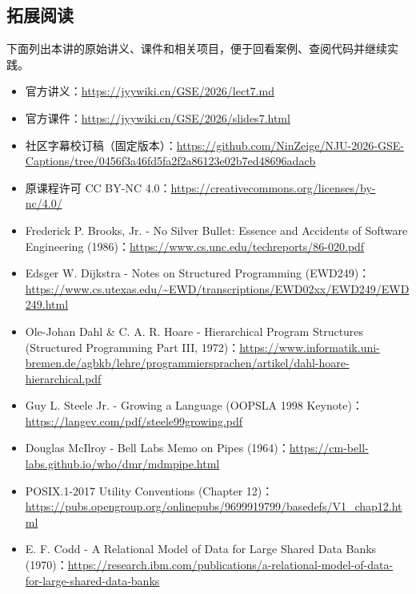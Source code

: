 \documentclass[UTF8,a4paper,11pt,fontset=fandol]{ctexart}
\begin{document}
\subsection{拓展阅读}

下面列出本讲的原始讲义、课件和相关项目，便于回看案例、查阅代码并继续实践。

\begin{itemize}

\item 官方讲义：\url{https://jyywiki.cn/GSE/2026/lect7.md}

\item 官方课件：\url{https://jyywiki.cn/GSE/2026/slides7.html}

\item 社区字幕校订稿（固定版本）：\url{https://github.com/NinZeige/NJU-2026-GSE-Captions/tree/0456f3a46fd5fa2f2a86123e02b7ed48696adacb}

\item 原课程许可 CC BY-NC 4.0：\url{https://creativecommons.org/licenses/by-nc/4.0/}

\item Frederick P. Brooks, Jr. - No Silver Bullet: Essence and Accidents of Software Engineering (1986)：\url{https://www.cs.unc.edu/techreports/86-020.pdf}

\item Edsger W. Dijkstra - Notes on Structured Programming (EWD249)：\url{https://www.cs.utexas.edu/~EWD/transcriptions/EWD02xx/EWD249/EWD249.html}

\item Ole-Johan Dahl \& C. A. R. Hoare - Hierarchical Program Structures (Structured Programming Part III, 1972)：\url{https://www.informatik.uni-bremen.de/agbkb/lehre/programmiersprachen/artikel/dahl-hoare-hierarchical.pdf}

\item Guy L. Steele Jr. - Growing a Language (OOPSLA 1998 Keynote)：\url{https://langev.com/pdf/steele99growing.pdf}

\item Douglas McIlroy - Bell Labs Memo on Pipes (1964)：\url{https://cm-bell-labs.github.io/who/dmr/mdmpipe.html}

\item POSIX.1-2017 Utility Conventions (Chapter 12)：\url{https://pubs.opengroup.org/onlinepubs/9699919799/basedefs/V1_chap12.html}

\item E. F. Codd - A Relational Model of Data for Large Shared Data Banks (1970)：\url{https://research.ibm.com/publications/a-relational-model-of-data-for-large-shared-data-banks}


\end{itemize}
\end{document}
